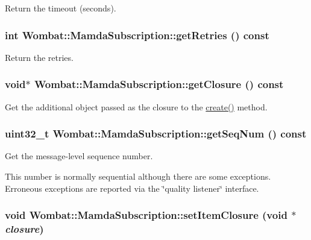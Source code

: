 Return the timeout (seconds). 

\hypertarget{classWombat_1_1MamdaSubscription_624e4473fbe1118382a863fc19e8e922}{
\subsubsection[getRetries]{\setlength{\rightskip}{0pt plus 5cm}int Wombat::Mamda\-Subscription::get\-Retries () const}}
\label{classWombat_1_1MamdaSubscription_624e4473fbe1118382a863fc19e8e922}


Return the retries. 

\hypertarget{classWombat_1_1MamdaSubscription_94f2a70bd2c4d39558a9c7b34d1a9de4}{
\subsubsection[getClosure]{\setlength{\rightskip}{0pt plus 5cm}void$\ast$ Wombat::Mamda\-Subscription::get\-Closure () const}}
\label{classWombat_1_1MamdaSubscription_94f2a70bd2c4d39558a9c7b34d1a9de4}


Get the additional object passed as the closure to the \hyperlink{classWombat_1_1MamdaSubscription_f73189395471119f1cffa620d9ad824e}{create()} method. 

\hypertarget{classWombat_1_1MamdaSubscription_b9b3dc27e6a1a40b52e9a1810e3042fe}{
\subsubsection[getSeqNum]{\setlength{\rightskip}{0pt plus 5cm}uint32\_\-t Wombat::Mamda\-Subscription::get\-Seq\-Num () const}}
\label{classWombat_1_1MamdaSubscription_b9b3dc27e6a1a40b52e9a1810e3042fe}


Get the message-level sequence number. 

This number is normally sequential although there are some exceptions. Erroneous exceptions are reported via the \char`\"{}quality listener\char`\"{} interface. \hypertarget{classWombat_1_1MamdaSubscription_44bbc1a7a16e9415099166d69346e6a2}{
\subsubsection[setItemClosure]{\setlength{\rightskip}{0pt plus 5cm}void Wombat::Mamda\-Subscription::set\-Item\-Closure (void $\ast$ {\em closure})}}
\label{classWombat_1_1MamdaSubscription_44bbc1a7a16e9415099166d69346e6a2}


